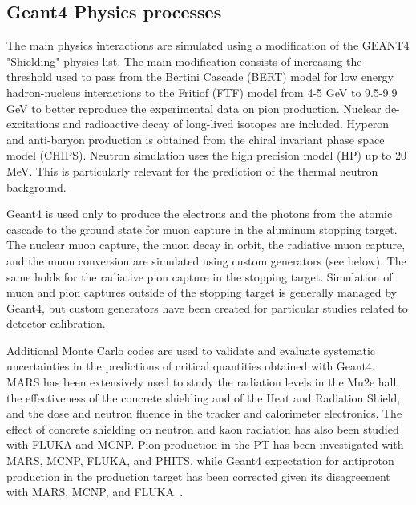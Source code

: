 \subsection{Geant4 Physics processes}
The main physics interactions are simulated using a modification of the GEANT4 "Shielding" physics list. The main modification consists of increasing the threshold used to pass from the Bertini Cascade (BERT) model for low energy hadron-nucleus interactions to the Fritiof (FTF) model from 4-5 GeV to 9.5-9.9 GeV to better reproduce the experimental data on pion production. Nuclear de-excitations and radioactive decay of long-lived isotopes are included. Hyperon and anti-baryon production is obtained from the chiral invariant phase space model (CHIPS). Neutron simulation uses the high precision model (HP) up to 20 MeV. This is particularly relevant for the prediction of the thermal neutron background.

Geant4 is used only to produce the electrons and the photons from the atomic cascade to the ground state for muon capture in the aluminum stopping target. The nuclear muon capture, the muon decay in orbit, the radiative muon capture, and the muon conversion are simulated using custom generators (see below). The same holds for the radiative pion capture in the stopping target. Simulation of muon and pion captures outside of the stopping target is generally managed by Geant4, but custom generators have been created for particular studies related to detector calibration.  

Additional Monte Carlo codes are used to validate and evaluate systematic uncertainties in the predictions of critical quantities obtained with Geant4. MARS has been extensively used to study the radiation levels in the Mu2e hall, the effectiveness of the concrete shielding and of the Heat and Radiation Shield, and the dose and neutron fluence in the tracker and calorimeter electronics. The effect of concrete shielding on neutron and kaon radiation has also been studied with FLUKA and MCNP. Pion production in the PT has been investigated with MARS, MCNP, FLUKA, and PHITS, while Geant4 expectation for antiproton production in the production target has been corrected given its disagreement with MARS, MCNP, and FLUKA~\cite{Mu2e:2022ggl}. 

